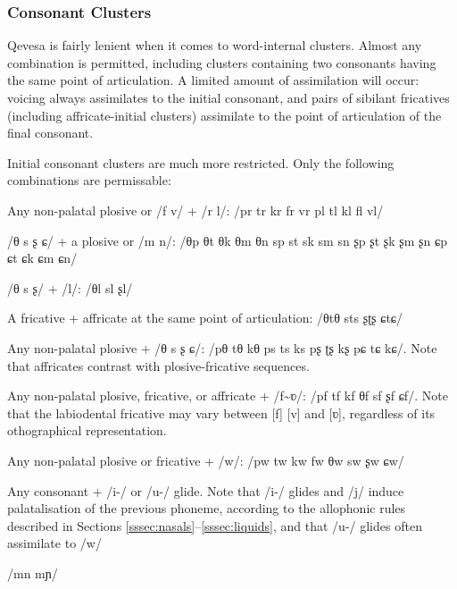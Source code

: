 \documentclass[grammar]{subfiles}
\begin{document}
	\subsubsection{Consonant Clusters}
	\label{sssec:consonant_clusters}

	Qevesa is fairly lenient when it comes to word-internal clusters. Almost any combination is permitted, including clusters containing two consonants having the same point of articulation. A limited amount of assimilation will occur: voicing always assimilates to the initial consonant, and pairs of sibilant fricatives (including affricate-initial clusters) assimilate to the point of articulation of the final consonant. %


	Initial consonant clusters are much more restricted. Only the following combinations are permissable:

	\begin{itemize*}
	\item Any non-palatal plosive or /f v/ + /r l/: /pr tr kr fr vr pl tl kl fl vl/ 
	\item /θ s ʂ ɕ/ + a plosive or /m n/: /θp θt θk θm θn sp st sk sm sn ʂp ʂt ʂk ʂm ʂn ɕp ɕt ɕk ɕm ɕn/
	\item /θ s ʂ/ + /l/: /θl sl ʂl/
	\item A fricative + affricate at the same point of articulation: /θtθ sts ʂʈʂ ɕtɕ/
	\item Any non-palatal plosive + /θ s ʂ ɕ/: /pθ tθ kθ ps ts ks pʂ ʈʂ kʂ pɕ tɕ kɕ/. Note that affricates contrast with plosive-fricative sequences.
	\item Any non-palatal plosive, fricative, or affricate + /f\textasciitilde ʋ/: /pf tf kf θf sf ʂf ɕf/. Note that the labiodental fricative may vary between [f] [v] and [ʋ], regardless of its othographical representation.
	\item Any non-palatal plosive or fricative + /w/: /pw tw kw fw θw sw ʂw ɕw/
	\item Any consonant + /i-/ or /u-/ glide. Note that /i-/ glides and /j/ induce palatalisation of the previous phoneme, according to the allophonic rules described in Sections \ref{sssec:nasals}–\ref{sssec:liquids}, and that /u-/ glides often assimilate to /w/
	\item /mn mɲ/
	\end{itemize*}
\end{document}
